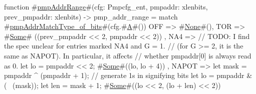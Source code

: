 function #\hyperref[sailRISCVzpmpAddrRange]{pmpAddrRange}#(cfg: Pmpcfg_ent, pmpaddr: xlenbits, prev_pmpaddr: xlenbits) -> pmp_addr_range = {
  match #\hyperref[sailRISCVzpmpAddrMatchTypezyofzybits]{pmpAddrMatchType\_of\_bits}#(cfg.#\hyperref[sailRISCVzA]{A}#()) {
    OFF   => #\hyperref[sailRISCVzNone]{None}#(),
    TOR   => { #\hyperref[sailRISCVzSome]{Some}# ((prev_pmpaddr << 2, pmpaddr << 2)) },
    NA4   => { // TODO: I find the spec unclear for entries marked NA4 and G = 1.
               // (for G >= 2, it is the same as NAPOT). In particular, it affects
               // whether pmpaddr[0] is always read as 0.
               let lo = pmpaddr << 2;
               #\hyperref[sailRISCVzSome]{Some}#((lo, lo + 4))
             },
    NAPOT => { let mask = pmpaddr ^ (pmpaddr + 1);  // generate 1s in signifying bits
               let lo   = pmpaddr & (~ (mask));
               let len  = mask + 1;
               #\hyperref[sailRISCVzSome]{Some}#((lo << 2, (lo + len) << 2))
             }
  }
}
